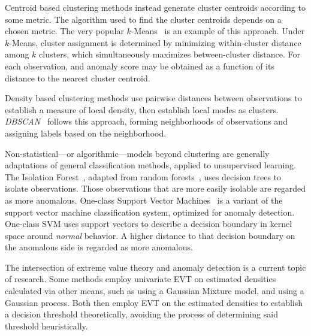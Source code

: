 Centroid based clustering methods instead generate cluster centroids 
    according to some metric.  The algorithm used to find the cluster centroids 
    depends on a chosen metric.  The very popular $k$-Means~\citep{hartigan1979} 
    is an example of this approach. Under $k$-Means, cluster assignment is 
    determined by minimizing within-cluster distance among $k$ clusters, which 
    simultaneously maximizes between-cluster distance. For each observation, 
    and anomaly score may be obtained as a function of its distance to the 
    nearest cluster centroid.  
    
Density based clustering methods use pairwise distances between observations to 
    establish a measure of local density, then establish local modes as 
    clusters.  \emph{DBSCAN}~\citep{ester1996} follows this approach, forming 
    neighborhoods of observations and assigning labels based on the 
    neighborhood. 
    
Non-statistical---or algorithmic---models beyond clustering are generally adaptations 
    of general classification methods, applied to unsupervised learning.  
    The Isolation Forest~\citep{liu2000}, adapted from random 
    forests~\citep{breiman2001}, uses decision trees to isolate observations.
    Those observations that are more easily isolable are regarded as more 
    anomalous.  One-class Support Vector Machines~\citep{chang2011} is a variant
    of the support vector machine classification system, optimized for 
    anomaly detection.  One-class SVM uses support vectors to describe a 
    decision boundary in kernel space around \emph{normal} behavior. A higher 
    distance to that decision boundary on the anomalous side is regarded as 
    more anomalous.
    
The intersection of extreme value theory and anomaly detection is a current 
    topic of research.  Some methods employ univariate EVT on estimated 
    densities calculated via other means, such as \cite{clifton2011} using a 
    Gaussian Mixture model, and \cite{gu2021} using a Gaussian process.  Both 
    then employ EVT on the estimated densities to establish a decision 
    threshold theoretically, avoiding the process of determining said
    threshold heuristically.

